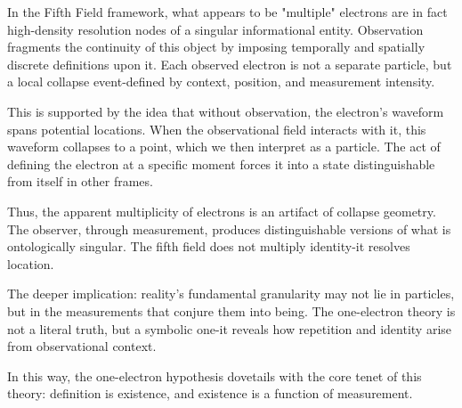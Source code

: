 In the Fifth Field framework, what appears to be "multiple" electrons are in fact high-density resolution nodes of a singular informational entity. Observation fragments the continuity of this object by imposing temporally and spatially discrete definitions upon it. Each observed electron is not a separate particle, but a local collapse event-defined by context, position, and measurement intensity.

This is supported by the idea that without observation, the electron’s waveform spans potential locations. When the observational field interacts with it, this waveform collapses to a point, which we then interpret as a particle. The act of defining the electron at a specific moment forces it into a state distinguishable from itself in other frames.

Thus, the apparent multiplicity of electrons is an artifact of collapse geometry\cite{chapter8_meta}. The observer, through measurement, produces distinguishable versions of what is ontologically singular. The fifth field does not multiply identity-it resolves location.

The deeper implication: reality’s fundamental granularity may not lie in particles, but in the measurements that conjure them into being. The one-electron theory is not a literal truth, but a symbolic one-it reveals how repetition and identity arise from observational context.

In this way, the one-electron hypothesis dovetails with the core tenet of this theory: definition is existence, and existence is a function of measurement.

